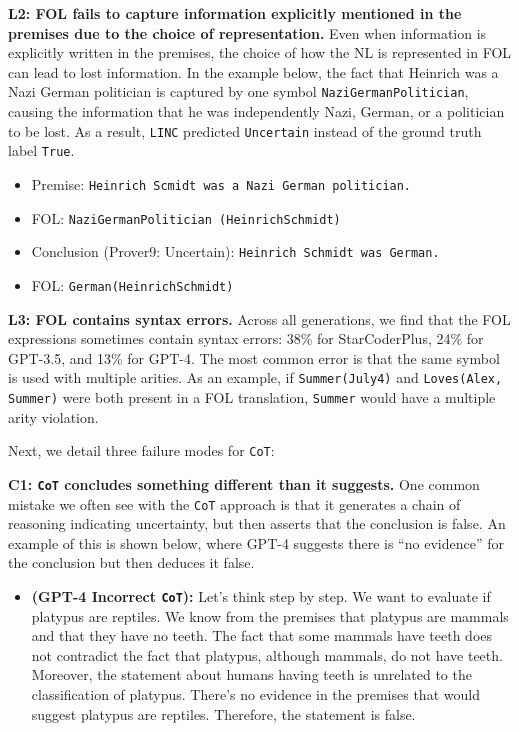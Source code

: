 \documentclass[11pt]{article}
\begin{document}
\textbf{L2: FOL fails to capture information explicitly mentioned in the premises due to the choice of representation.} Even when information is explicitly written in the premises, the choice of how the NL is represented in FOL can lead to lost information. In the example below, the fact that Heinrich was a Nazi German politician is captured by one symbol \texttt{NaziGermanPolitician}, causing the information that he was independently Nazi, German, or a politician to be lost.
As a result, \texttt{LINC} predicted \texttt{Uncertain} instead of the ground truth label \texttt{True}.

\begin{itemize}[leftmargin=*]
\itemsep0.1em
    \item[] \small Premise: \texttt{Heinrich Scmidt was a Nazi German politician.}
    \item[] \small FOL: \texttt{NaziGermanPolitician (HeinrichSchmidt)}
    \item[] \small Conclusion (Prover9: Uncertain): \texttt{Heinrich Schmidt was German.}
    \item[] \small FOL: \texttt{German(HeinrichSchmidt)}
\end{itemize}

\textbf{L3: FOL contains syntax errors.}  Across all generations, we find that the FOL expressions sometimes contain syntax errors: 38\% for StarCoderPlus, 24\% for GPT-3.5, and 13\% for GPT-4. The most common error is that the same symbol is used with multiple arities. As an example, if \texttt{Summer(July4)} and \texttt{Loves(Alex, Summer)} were both present in a FOL translation, \texttt{Summer} would have a multiple arity violation.

Next, we detail three failure modes for \texttt{CoT}:

\textbf{C1: \texttt{CoT} concludes something different than it suggests.} One common mistake we often see with the \texttt{CoT} approach is that it generates a chain of reasoning indicating uncertainty, but then asserts that the conclusion is false. An example of this is shown below, where GPT-4 suggests there is ``no evidence'' for the conclusion but then deduces it false.

\begin{itemize}[leftmargin=*]
\itemsep0.1em
    \item[] \small \textbf{(GPT-4 Incorrect \texttt{CoT}):} Let's think step by step. We want to evaluate if platypus are reptiles. We know from the premises that platypus are mammals and that they have no teeth. The fact that some mammals have teeth does not contradict the fact that platypus, although mammals, do not have teeth. Moreover, the statement about humans having teeth is unrelated to the classification of platypus. There's no evidence in the premises that would suggest platypus are reptiles. Therefore, the statement is false.
\end{itemize}
\end{document}
